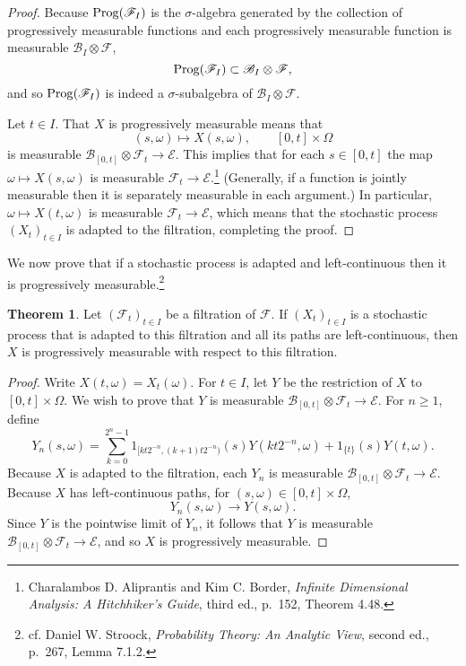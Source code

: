 \documentclass{article}
\newcommand{\Prog}{\ensuremath\mathrm{Prog}}
\theoremstyle{definition}
\newtheorem{theorem}{Theorem}
\theoremstyle{definition}
\begin{document}
\begin{proof}
Because $\Prog(\mathscr{F}_I)$ is the $\sigma$-algebra generated by the collection
of progressively measurable functions and each progressively measurable function is measurable
$\mathscr{B}_I \otimes \mathscr{F}$, 
\[
\Prog(\mathscr{F}_I) \subset \mathscr{B}_I \otimes \mathscr{F},
\]
and so $\Prog(\mathscr{F}_I)$ is indeed a $\sigma$-subalgebra of $\mathscr{B}_I \otimes \mathscr{F}$. 

Let $t \in I$. That $X$ is progressively measurable means that 
\[
(s,\omega) \mapsto X(s,\omega), \qquad [0,t] \times \Omega
\]
is measurable $\mathscr{B}_{[0,t]} \otimes \mathscr{F}_t \to \mathscr{E}$. This implies that for each $s \in [0,t]$ the map
$\omega \mapsto X(s,\omega)$ is measurable $\mathscr{F}_t \to \mathscr{E}$.\footnote{Charalambos D. Aliprantis and Kim C. Border, {\em Infinite Dimensional Analysis:
A Hitchhiker's Guide}, third ed., p.~152, Theorem 4.48.} (Generally, if a function is jointly measurable then it is separately measurable in each argument.)
In particular, $\omega \mapsto X(t,\omega)$ is measurable $\mathscr{F}_t \to \mathscr{E}$, which means that the stochastic process $(X_t)_{t \in I}$ is adapted
to the filtration, completing the proof.
\end{proof}


We now prove that if a stochastic process is adapted and left-continuous then it is progressively
measurable.\footnote{cf. Daniel W. Stroock, {\em Probability Theory: An Analytic View}, second ed.,
p.~267, Lemma 7.1.2.}

\begin{theorem}
Let $(\mathscr{F}_t)_{t \in I}$ be a filtration of $\mathscr{F}$. If $(X_t)_{t \in I}$ is a stochastic
process that is adapted to this filtration and all its paths are left-continuous, then $X$ is progressively measurable with respect to this filtration.
\end{theorem}
\begin{proof}
Write $X(t,\omega)=X_t(\omega)$. 
For $t \in I$,
let $Y$ be the restriction of $X$ to $[0,t] \times \Omega$. We wish to prove that $Y$ is measurable
$\mathscr{B}_{[0,t]} \otimes \mathscr{F}_t \to \mathscr{E}$. 
For $n \geq 1$, define
\[
Y_n(s,\omega) = \sum_{k=0}^{2^n-1} 1_{[kt2^{-n},(k+1)t2^{-n})}(s) Y(kt2^{-n},\omega)
+1_{\{t\}}(s) Y(t,\omega).
\]
Because $X$ is adapted to the filtration,
each $Y_n$ is measurable $\mathscr{B}_{[0,t]} \otimes \mathscr{F}_t \to \mathscr{E}$.
Because $X$ has left-continuous paths, for $(s,\omega) \in [0,t] \times \Omega$,
\[
Y_n(s,\omega) \to Y(s,\omega). 
\]
Since $Y$ is the pointwise limit of $Y_n$, it follows that $Y$ is measurable $\mathscr{B}_{[0,t]} \otimes \mathscr{F}_t \to \mathscr{E}$,
and so $X$ is progressively measurable.
\end{proof}
\end{document}
